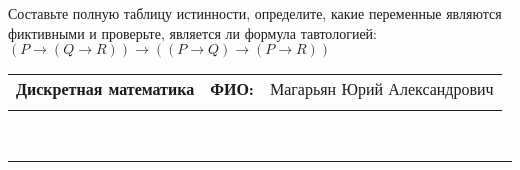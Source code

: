 \documentclass[10pt]{exam}
\newcommand{\class}{Дискретная математика}
\newcommand{\examdate}{}
\begin{document}
\begin{questions}
\begin{enumerate} [a)]
\end{enumerate}\question Составьте полную таблицу истинности, определите, какие переменные являются фиктивными и проверьте, является ли формула тавтологией:
$(P \rightarrow (Q \rightarrow R)) \rightarrow ((P \rightarrow Q) \rightarrow (P \rightarrow R))$

\end{questions}
\newpage
\begin{flushright}
\begin{tabular}{p{2.8in} r l}
\textbf{\class} & \textbf{ФИО:} &Магарьян Юрий Александрович
\\

\textbf{\examdate} &&\\
\end{tabular}\\
\end{flushright}
\rule[1ex]{\textwidth}{.1pt}
\end{document}
